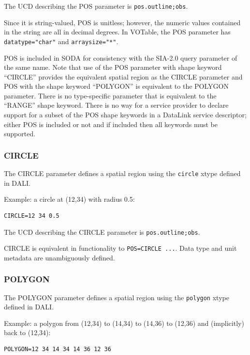 \documentclass[11pt,a4paper]{ivoa}
\newcommand{\xtype}[1]{\texttt{#1}}
\newcommand{\ucd}[1]{\texttt{#1}}
\begin{document}
The UCD  describing the POS parameter is \ucd{pos.outline;obs}.

Since it is string-valued, POS is unitless; however, the numeric values
contained in the string are all in decimal degrees. In VOTable, the
POS parameter has \verb|datatype="char"| and \verb|arraysize="*"|.



POS is included in SODA  for consistency with the SIA-2.0
 query parameter of the same name. Note that use of the
POS parameter with shape keyword ``CIRCLE'' provides the equivalent
spatial region as the CIRCLE parameter and POS with the shape keyword
``POLYGON'' is equivalent to the POLYGON parameter. There is no
type-specific parameter that is equivalent to the ``RANGE'' shape
keyword. There is no way for a service provider to declare support for a
subset of the POS shape keywords in a DataLink
service descriptor; either POS is included or not and if included then
all keywords must be supported.

\subsubsection{CIRCLE} 
\label{sec:CIRCLE}

The CIRCLE parameter defines a spatial region using the \xtype{circle}
xtype defined in DALI.

Example: a circle at (12,34) with radius 0.5:

\begin{lstlisting}
CIRCLE=12 34 0.5
\end{lstlisting}

The UCD describing the CIRCLE parameter is
\ucd{pos.outline;obs}.

CIRCLE is equivalent in functionality  to \texttt{POS=CIRCLE ...}.  Data type  and unit metadata are unambiguously defined.

\subsubsection{POLYGON}
\label{sec:POLYGON}

The POLYGON parameter defines a spatial region using the \xtype{polygon}
xtype defined in DALI.

Example: a  polygon from (12,34) to (14,34) to (14,36) to (12,36) and
(implicitly) back to (12,34):

\begin{lstlisting}
POLYGON=12 34 14 34 14 36 12 36
\end{lstlisting}
\end{document}
